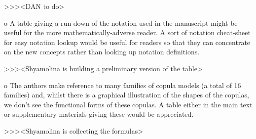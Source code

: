 >>><DAN to do>

o    A table giving a run-down of the notation used in the manuscript might be useful for the more mathematically-adverse reader.  A sort of notation cheat-sheet for easy notation lookup would be useful for readers so that they can concentrate on the new concepts rather than looking up notation definitions.

>>><Shyamolina is building a preliminary version of the table>

o    The authors make reference to many families of copula models (a total of 16 families) and, whilst there is a graphical illustration of the shapes of the copulas, we don't see the functional forms of these copulas.  A table either in the main text or supplementary materials giving these would be appreciated.
 
>>><Shyamolina is collecting the formulas>
